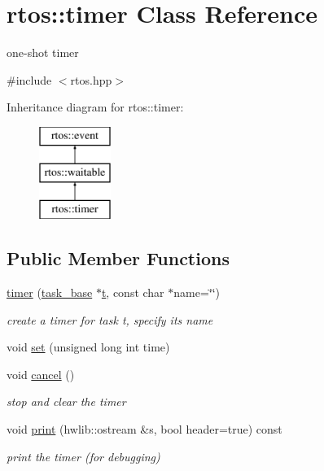 \hypertarget{classrtos_1_1timer}{}\section{rtos\+:\+:timer Class Reference}
\label{classrtos_1_1timer}


one-\/shot timer  




{\ttfamily \#include $<$rtos.\+hpp$>$}

Inheritance diagram for rtos\+:\+:timer\+:\begin{figure}[H]
\begin{center}
\leavevmode
\includegraphics[height=3.000000cm]{classrtos_1_1timer}
\end{center}
\end{figure}
\subsection*{Public Member Functions}
\begin{DoxyCompactItemize}
\item 
\hyperlink{classrtos_1_1timer_a6c1cdeef312f1ed2b946097ef9196483}{timer} (\hyperlink{classrtos_1_1task__base}{task\+\_\+base} $\ast$\hyperlink{classrtos_1_1event_aa83745aabc941145f00386fd63f6b557}{t}, const char $\ast$name=\char`\"{}\char`\"{})\hypertarget{classrtos_1_1timer_a6c1cdeef312f1ed2b946097ef9196483}{}\label{classrtos_1_1timer_a6c1cdeef312f1ed2b946097ef9196483}

\begin{DoxyCompactList}\small\item\em create a timer for task t, specify its name \end{DoxyCompactList}\item 
void \hyperlink{classrtos_1_1timer_a8b5641b2d3cc0a5c9b48de1e5f7d0930}{set} (unsigned long int time)
\item 
void \hyperlink{classrtos_1_1timer_ab93748433cbd29c8753ed2bd74f90dd6}{cancel} ()
\begin{DoxyCompactList}\small\item\em stop and clear the timer \end{DoxyCompactList}\item 
void \hyperlink{classrtos_1_1timer_a4f80789abed43247008431021a2525b6}{print} (hwlib\+::ostream \&s, bool header=true) const \hypertarget{classrtos_1_1timer_a4f80789abed43247008431021a2525b6}{}\label{classrtos_1_1timer_a4f80789abed43247008431021a2525b6}

\begin{DoxyCompactList}\small\item\em print the timer (for debugging) \end{DoxyCompactList}\end{DoxyCompactItemize}
